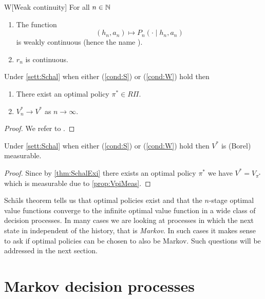 \begin{cond}{W}[Weak continuity]
  For all $n \in \mathbb{N}$ 
  \begin{enumerate}
    \item The function
      \[(h_n, a_n) \mapsto P_n(\cdot \mid h_n, a_n)\]
	is weakly continuous (hence the name ).
    \item $r_n$ is continuous.
  \end{enumerate}
  \label{cond:W}
\end{cond}

\begin{thm}[Schäl]
  Under \cref{sett:Schal} when either (\cref{cond:S}) or (\cref{cond:W}) hold
  then
  \begin{enumerate}
    \item There exist an optimal policy $\pi^* \in R\Pi$.
    \item $V^*_n \to V^*$ as $n \to \infty$.
  \end{enumerate}
  \label{thm:SchalExi}
\end{thm}
\begin{proof}
  We refer to . %
\end{proof}

\begin{cor}
  Under \cref{sett:Schal} when either (\cref{cond:S}) or (\cref{cond:W}) hold then
  $V^*$ is (Borel) measurable.
\end{cor}
\begin{proof}
  Since by \cref{thm:SchalExi} there exists an optimal policy $\pi^*$ we have
  $V^* = V_{\pi^*}$ which is measurable due to \cref{prop:VpiMeas}.
\end{proof}

Schäls theorem tells us that optimal policies exist and that the $n$-stage optimal value functions converge to the infinite optimal value function in a wide class
of decision processes.
In many cases we are looking at processes
in which the next state in independent of the history,
that is \emph{Markov}.
In such cases it makes sense to ask if optimal policies can be chosen
to also be Markov.
Such questions will be addressed in the next section.

\section{Markov decision processes}


